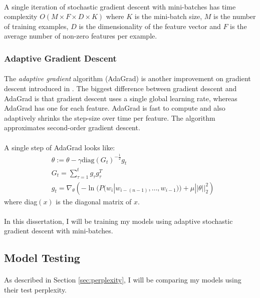 \paragraph{}
A single iteration of stochastic gradient descent with mini-batches has time complexity $O(M\times F \times D\times K)$ where $K$ is the mini-batch size, $M$ is the number of training examples, $D$ is the dimensionality of the feature vector and $F$ is the average number of non-zero features per example. 

\subsubsection{Adaptive Gradient Descent}
\paragraph{}
The \emph{adaptive gradient} algorithm (AdaGrad) is another improvement on gradient descent introduced in \cite{Duchi2011}. The biggest difference between gradient descent and AdaGrad is that gradient descent uses a single global learning rate, whereas AdaGrad has one for each feature. AdaGrad is fast to compute and also adaptively shrinks the step-size over time per feature. The algorithm approximates second-order gradient descent.
\paragraph{}
A single step of AdaGrad looks like:
\begin{align}
& \theta := \theta - \gamma \mbox{diag}(G_t)^{-\frac{1}{2}} g_t
\\
&G_t = \sum_{\tau=1}^t g_{\tau} g_{\tau}^T \nonumber
\\
& g_t =\nabla_\theta \left( -\ln(P(w_i | w_{i-(n-1)},\dots, w_{i-1})) +  \mu ||\theta||^2_2 \right) \nonumber
\end{align}
where diag$(x)$ is the diagonal matrix of $x$.
\paragraph{}
In this dissertation, I will be training my models using adaptive stochastic gradient descent with mini-batches.

\subsection{Model Testing}
\paragraph{}
As described in Section \ref{sec:perplexity}, I will be comparing my models using their test perplexity.
